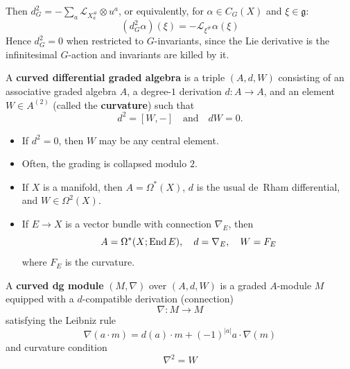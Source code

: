 \documentclass[12pt]{article}
\begin{document}
Then $d_G^2 = -\sum_a \mathcal{L}_{X_a^\#} \otimes u^a$, or equivalently, for $\alpha \in C_G(X)$ and $\xi \in \mathfrak{g}$:
\[
(d_G^2\alpha)(\xi) = -\mathcal{L}_{\xi^\#}\alpha(\xi)
\]
Hence $d_G^2=0$ when restricted to $G$-invariants, since the Lie derivative is the infinitesimal $G$-action and invariants are killed by it. 

\begin{definition}
A \textbf{curved differential graded algebra} is a triple $(A,d,W)$ consisting of an associative graded algebra $A$, a degree-$1$ derivation $d : A \to A$, and an element $W \in A^{(2)}$ (called the \textbf{curvature})
such that
\[
d^2 = [W, -] \quad \text{and} \quad dW = 0.
\]
\end{definition}

\begin{itemize}
    \item If $d^2 = 0$, then $W$ may be any central element.
    \item Often, the grading is collapsed modulo $2$.
    \item If $X$ is a manifold, then $A = \Omega^*(X)$, $d$ is the usual de~Rham differential, and $W \in \Omega^2(X)$.
    \item If $E \to X$ is a vector bundle with connection $\nabla_E$, then
    \[
    A = \Omega^*(X; \operatorname{End} E), \quad d = \nabla_E, \quad W = F_E
    \]
    where $F_E$ is the curvature.
\end{itemize}


\begin{definition}
A \textbf{curved dg module} $(M,\nabla)$ over $(A,d,W)$ is a graded $A$-module $M$
equipped with a $d$-compatible derivation (connection)
\[
\nabla : M \to M
\]
satisfying the Leibniz rule
\[
\nabla(a \cdot m) = d(a) \cdot m + (-1)^{|a|} a \cdot \nabla(m)
\]
and curvature condition
\[
\nabla^2 = W
\]
\end{definition}
\end{document}
